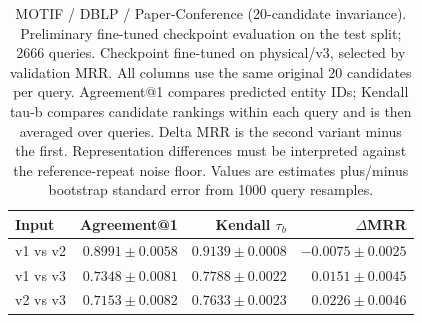 \begin{table}[t]
\centering
\small
\begin{tabular}{lrrr}
\toprule
Input & Agreement@1 & Kendall $\tau_b$ & $\Delta$MRR \\
\midrule
v1 vs v2 & $0.8991 \pm 0.0058$ & $0.9139 \pm 0.0008$ & $-0.0075 \pm 0.0025$ \\
v1 vs v3 & $0.7348 \pm 0.0081$ & $0.7788 \pm 0.0022$ & $0.0151 \pm 0.0045$ \\
v2 vs v3 & $0.7153 \pm 0.0082$ & $0.7633 \pm 0.0023$ & $0.0226 \pm 0.0046$ \\
\bottomrule
\end{tabular}
\caption{MOTIF / DBLP / Paper-Conference (20-candidate invariance). Preliminary fine-tuned checkpoint evaluation on the test split; 2666 queries. Checkpoint fine-tuned on physical/v3, selected by validation MRR. All columns use the same original 20 candidates per query. Agreement@1 compares predicted entity IDs; Kendall tau-b compares candidate rankings within each query and is then averaged over queries. Delta MRR is the second variant minus the first. Representation differences must be interpreted against the reference-repeat noise floor. Values are estimates plus/minus bootstrap standard error from 1000 query resamples.}
\label{tab:motif-paper_conference-invariance}
\end{table}
